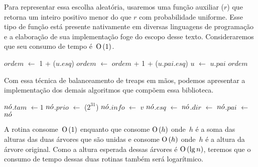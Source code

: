 Para representar essa escolha aleatória, usaremos uma função auxiliar \random($r$) que retorna um inteiro positivo menor do que $r$ com probabilidade uniforme. Esse tipo de função está presente nativamente em diversas linguagens de programação e a elaboração de sua implementação foge do escopo desse texto. Consideraremos que seu consumo de tempo é~$\text{O}\left(1\right)$.

\begin{algorithm}
\caption{\treapOrder($u$)}
\label{Algo:TREAPorder}
\begin{algorithmic}[1]
\State $ordem$ $\gets$ 1 + \treapGetSize($u$.$esq$)
  \State $ordem$ $\gets$ $ordem$ + 1 + \treapGetSize($u$.$pai$.$esq$)
\EndIf
  \State $u$ $\gets$ $u$.$pai$
\EndWhile
\State \Return $ordem$
\end{algorithmic}
\end{algorithm}

Com essa técnica de balanceamento de treaps em mãos, podemos apresentar a implementação dos demais algoritmos que compõem essa biblioteca.

\begin{algorithm}
\caption{\treapCreate($v$)}
\label{Algo:TREAPbuild}
\begin{algorithmic}[1]
\State $n\acute{o}$.$tam$ $\gets 1$
\State $n\acute{o}$.$prio$ $\gets$ \random($2^{31}$)
\State $n\acute{o}$.$info$ $\gets$ $v$
\State $n\acute{o}$.$esq$ $\gets$ $n\acute{o}$.$dir$ $\gets$ $n\acute{o}$.$pai$ $\gets$ \Nil
\State \Return $n\acute{o}$
\end{algorithmic}
\end{algorithm}

\newpage
A rotina \treapCreate{} consome~$\text{O}\left(1\right)$ enquanto que \treapJoin{} consome $\text{O}\left(h\right)$ onde~$h$ é a soma das alturas das duas árvores que são unidas e \treapSplit{} consome $\text{O}\left(h\right)$ onde~$h$ é a altura da árvore original. Como a altura esperada dessas árvores é  $\text{O}\left(\lg n\right)$, teremos que o consumo de tempo dessas duas rotinas também será logarítmico.

